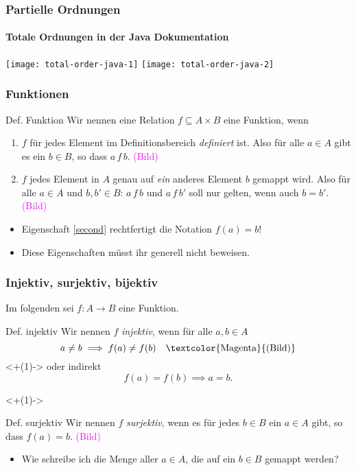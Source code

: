\documentclass[t,dvipsnames]{beamer}
\newcommand{\isrel}[3]{#1 \, #3 \, #2}
\newcommand{\hintIllustration}{\textcolor{Magenta}{(Bild)}}
\begin{document}
\begin{frame}
	\frametitle{Partielle Ordnungen}
	\framesubtitle{Totale Ordnungen in der Java Dokumentation}
	\texttt{[image: total-order-java-1]}
	\texttt{[image: total-order-java-2]}
\end{frame}

\begin{frame}
	\frametitle{Funktionen}
	\begin{block}{Def. Funktion}
		Wir nennen eine Relation $f \subseteq A \times B$ eine Funktion, wenn
		\begin{enumerate}[<+(1)->]
			\item $f$ für jedes Element im Definitionsbereich \textit{definiert} ist. Also für alle $a \in A$ gibt es ein $b \in B$, so dass $\isrel{a}{b}{f}$. \hintIllustration
			\item \label{second} $f$ jedes Element in $A$ genau auf \textit{ein} anderes Element $b$ gemappt wird. Also für alle $a \in A$ und $b, b' \in B$: $\isrel{a}{b}{f}$ und $\isrel{a}{b'}{f}$ soll nur gelten, wenn auch $b = b'$. \hintIllustration
		\end{enumerate}
	\end{block}
	\begin{itemize}[<+(1)->]
		\item Eigenschaft \ref{second} rechtfertigt die Notation $f(a) = b$!
		\item Diese Eigenschaften müsst ihr generell nicht beweisen.
	\end{itemize}
\end{frame}

\begin{frame}
	\frametitle{Injektiv, surjektiv, bijektiv}
	Im folgenden sei $f: A \rightarrow B$ eine Funktion.
	\begin{block}{Def. injektiv}
		Wir nennen $f$ \textit{injektiv}, wenn für alle $a, b \in A$
		$$
			a \neq b \implies f(a) \neq f(b) \quad \mbox{\hintIllustration}
		$$
		\only<+(1)->{
			oder indirekt
			$$
				f(a) = f(b) \implies a = b.
			$$
		}
	\end{block}
	\only<+(1)->{
		\begin{block}{Def. surjektiv}
			Wir nennen $f$ \textit{surjektiv}, wenn es für jedes $b \in B$ ein $a \in A$ gibt, so dass $f(a) = b$. \hintIllustration
		\end{block}
	}
	\begin{itemize}[<+(1)>]
		\item Wie schreibe ich die Menge aller $a \in A$, die auf ein $b \in B$ gemappt werden?
	\end{itemize}
\end{frame}
\end{document}
